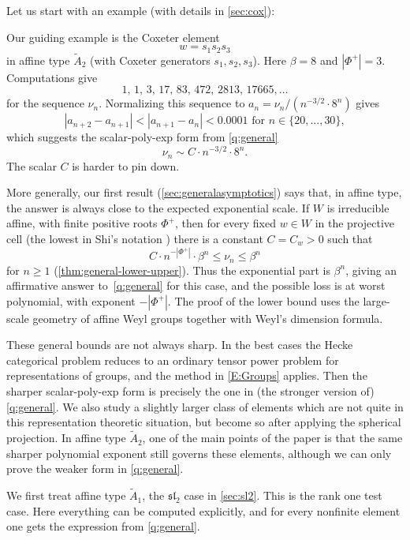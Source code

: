 \documentclass[a4paper,11pt]{amsart}
\renewcommand{\dots}{\text{...}}
\numberwithin{equation}{subsection}
\theoremstyle{definition}
\theoremstyle{remark}
\begin{document}
Let us start with an example (with details in \autoref{sec:cox}):

\begin{Example}\label{E:First}
Our guiding example is the Coxeter element
\[
w=s_1s_2s_3
\]
in affine type \(\widetilde A_2\) (with Coxeter generators $s_1,s_2,s_3$). Here $\beta=8$ and $|\Phi^+|=3$. Computations give
\[
1,\,1,\,3,\,17,\,83,\,472,\,2813,\,17665,\ldots
\]
for the sequence \(\nu_n\). Normalizing this sequence to $a_n=\nu_n/(n^{-3/2}\cdot 8^n)$ gives 
\[
|a_{n+2}-a_{n+1}|<|a_{n+1}-a_n|<0.0001\text{ for }n\in\{20,\dots,30\},
\]
which suggests the scalar-poly-exp form from \autoref{q:general}
\[
\nu_n\sim C\cdot n^{-3/2}\cdot 8^n.
\]
The scalar \(C\) is harder to pin down.
\end{Example}

More generally, our first result (\autoref{sec:generalasymptotics}) says
that, in affine type, the answer is always close to the expected exponential
scale. If \(W\) is irreducible affine, with finite positive roots \(\Phi^+\),
then for every fixed \(w\in W\) in the projective cell (the lowest in Shi's notation \cite{Shi-two-sided-cell-I,Shi-two-sided-cell-II}) there is a constant \(C=C_w>0\) such that
\[
C\cdot n^{-|\Phi^+|}\cdot \beta^n
\leq
\nu_n
\leq
\beta^n
\]
for $n \geq 1$ (\autoref{thm:general-lower-upper}). Thus the exponential part is \(\beta^n\), giving an affirmative answer to~\autoref{q:general} for this case,
and the possible loss is at worst polynomial, with exponent \(-|\Phi^+|\).
The proof of the lower bound uses the large-scale geometry of affine Weyl
groups together with Weyl's dimension formula.

These general bounds are not always sharp. In the best cases the
Hecke categorical problem reduces to an ordinary tensor power problem for
representations of groups, and the method in \autoref{E:Groups} applies. Then the sharper
scalar-poly-exp form is precisely the one in (the stronger version of) \autoref{q:general}.
We also study a slightly larger class of elements which are not quite in
this representation theoretic situation, but become so after applying the
spherical projection. In affine type \(\widetilde A_2\), one of the main
points of the paper is that the same sharper polynomial exponent still
governs these elements, although we can only prove the weaker form in \autoref{q:general}. 

We first treat affine type \(\widetilde A_1\), the \(\mathfrak{sl}_2\) case in \autoref{sec:sl2}. This is
the rank one test case. Here everything can be computed explicitly, and for
every nonfinite element one gets the expression from \autoref{q:general}.
\end{document}

